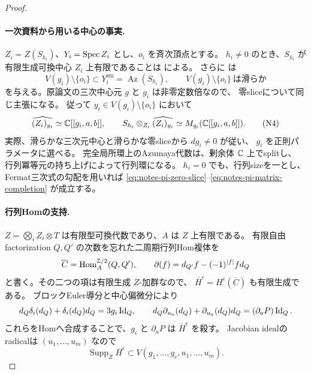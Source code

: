 \begin{proof}
\paragraph{一次資料から用いる中心の事実.}
\(Z_i=Z(S_{h_i})\)、\(Y_i=\operatorname{Spec} Z_i\) とし、\(o_i\) を斉次頂点とする。
\(h_i\ne0\) のとき、\(S_{h_i}\) が有限生成可換中心 \(Z_i\) 上有限であることは
\cite[Theorem 3.7(c), p.~38]{SmithTate} による。
さらに \cite[Theorem 1.3(1),(2a)]{WWY3} は
\[
 V(g_i)\setminus\{o_i\}\subset Y_i^{\mathrm{sm}}
       =\operatorname{Az}(S_{h_i}),\qquad
 V(g_i)\setminus\{o_i\}\ \text{は滑らか}
 \tag{N3}\label{eq:notes-pi-zero-slice}
\]
を与える。原論文の三次中心元 \(g\) と \(g_i\) は非零定数倍なので、
零sliceについて同じ主張になる。
従って \(y_i\in V(g_i)\setminus\{o_i\}\) において
\[
 \widehat{(Z_i)_{y_i}}\simeq\mathbb C[[g_i,a,b]],\qquad
 S_{h_i}\otimes_{Z_i}\widehat{(Z_i)_{y_i}}
       \simeq M_{q_i}(\mathbb C[[g_i,a,b]]).
 \tag{N4}\label{eq:notes-pi-matrix-completion}
\]
実際、滑らかな三次元中心と滑らかな零sliceから \(dg_i\ne0\) が従い、
\(g_i\) を正則パラメータに選べる。
完全局所環上のAzumaya代数は、剰余体 \(\mathbb C\) 上でsplitし、
行列冪等元の持ち上げによって行列環になる。
\(h_i=0\) でも、行列sizeを一とし、Fermat三次式の勾配を用いれば
\eqref{eq:notes-pi-zero-slice}--\eqref{eq:notes-pi-matrix-completion} が成立する。

\paragraph{行列Homの支持.}
\(Z=\bigotimes_i Z_i\otimes T\) は有限型可換代数であり、\(A\) は \(Z\) 上有限である。
有限自由factorization \(Q,Q'\) の次数を忘れた二周期行列Hom複体を
\[
 \overline C=\operatorname{Hom}_A^{\mathbb Z/2}(Q,Q'),\qquad
 \partial(f)=d_{Q'}f-(-1)^{|f|}fd_Q
\]
と書く。その二つの項は有限生成 \(Z\)-加群なので、
\(\overline H^\epsilon=H^{\bar\epsilon}(\overline C)\) も有限生成である。
ブロックEuler導分と中心偏微分により
\[
 d_Q\delta_i(d_Q)+\delta_i(d_Q)d_Q=3g_i\operatorname{Id}_Q,\qquad
 d_Q\partial_{u_a}(d_Q)+\partial_{u_a}(d_Q)d_Q
       =(\partial_aP)\operatorname{Id}_Q.
\]
これらをHomへ合成することで、\(g_i\) と \(\partial_aP\) は
\(\overline H^\epsilon\) を殺す。
Jacobian idealのradicalは \((u_1,\ldots,u_m)\) なので
\[
 \operatorname{Supp}_Z\overline H^\epsilon
 \subset V(g_1,\ldots,g_r,u_1,\ldots,u_m).
 \tag{N5}\label{eq:notes-pi-support}
\]


\end{proof}
